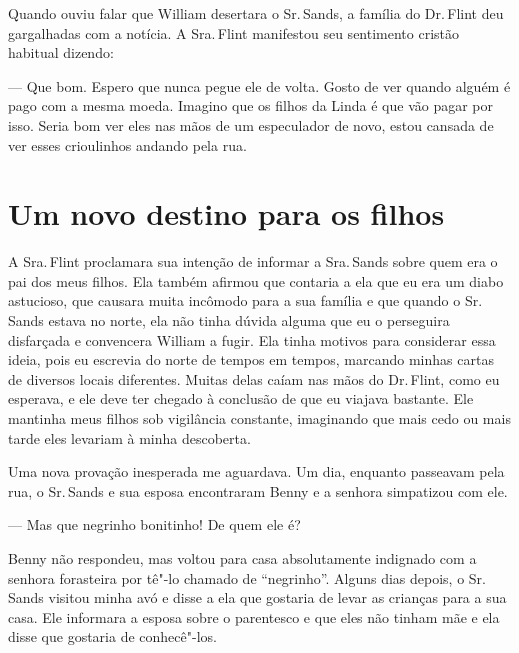 Quando ouviu falar que William
desertara o Sr.\,Sands, a família do Dr.\,Flint deu gargalhadas com a
notícia. A Sra.\,Flint manifestou seu sentimento cristão habitual
dizendo:

--- Que bom. Espero que nunca pegue ele de volta. Gosto de ver quando
alguém é pago com a mesma moeda. Imagino que os filhos da Linda é que
vão pagar por isso. Seria bom ver eles nas mãos de um especulador de
novo, estou cansada de ver esses crioulinhos andando pela rua.

\chapter*{Um novo destino para os filhos}

A Sra.\,Flint proclamara sua intenção de
informar a Sra.\,Sands sobre quem era o pai dos meus filhos. Ela também
afirmou que contaria a ela que eu era um diabo astucioso, que causara
muita incômodo para a sua família e que quando o Sr.\,Sands estava no
norte, ela não tinha dúvida alguma que eu o perseguira disfarçada e
convencera William a fugir. Ela tinha motivos para considerar essa
ideia, pois eu escrevia do norte de tempos em tempos, marcando minhas
cartas de diversos locais diferentes. Muitas delas caíam nas mãos do Dr.\,Flint, como eu esperava, e ele deve ter chegado à conclusão de que eu
viajava bastante. Ele mantinha meus filhos sob vigilância constante,
imaginando que mais cedo ou mais tarde eles levariam à minha descoberta.

Uma nova provação inesperada me
aguardava. Um dia, enquanto passeavam pela rua, o Sr.\,Sands e sua esposa
encontraram Benny e a senhora simpatizou com ele.

--- Mas que negrinho bonitinho! De quem ele é?

Benny não respondeu, mas voltou para
casa absolutamente indignado com a senhora forasteira por tê"-lo chamado
de ``negrinho''. Alguns dias depois, o Sr.\,Sands visitou minha avó e
disse a ela que gostaria de levar as crianças para a sua casa. Ele
informara a esposa sobre o parentesco e que eles não tinham mãe e ela
disse que gostaria de conhecê"-los.

